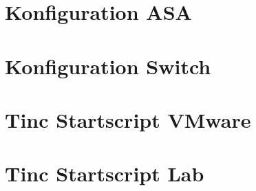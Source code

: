 \documentclass[11pt,a4paper,parskip=half]{scrartcl}
\begin{document}
\section{Konfiguration ASA}

\newpage

\section{Konfiguration Switch}

\newpage

\section{Tinc Startscript VMware}
\label{app:tinc-start-esx}

\newpage

\section{Tinc Startscript Lab}
\label{app:tinc-start-lab}

\newpage
\end{document}
